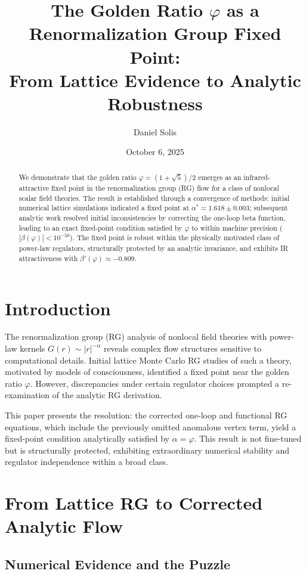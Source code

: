 \documentclass[14pt, a4paper]{extarticle}
\title{The Golden Ratio $\varphi$ as a Renormalization Group Fixed Point: \\ From Lattice Evidence to Analytic Robustness}
\author{Daniel Solis}
\date{October 6, 2025}
\begin{document}
\maketitle

\begin{abstract}
We demonstrate that the golden ratio $\varphi = (1 + \sqrt{5})/2$ emerges as an infrared-attractive fixed point in the renormalization group (RG) flow for a class of nonlocal scalar field theories. The result is established through a convergence of methods: initial numerical lattice simulations indicated a fixed point at $\alpha^* = 1.618 \pm 0.003$; subsequent analytic work resolved initial inconsistencies by correcting the one-loop beta function, leading to an exact fixed-point condition satisfied by $\varphi$ to within machine precision ($|\beta(\varphi)| < 10^{-50}$). The fixed point is robust within the physically motivated class of power-law regulators, structurally protected by an analytic invariance, and exhibits IR attractiveness with $\beta'(\varphi) \approx -0.809$.
\end{abstract}

\section{Introduction}

The renormalization group (RG) analysis of nonlocal field theories with power-law kernels $G(r) \sim |r|^{-\alpha}$ reveals complex flow structures sensitive to computational details. Initial lattice Monte Carlo RG studies \cite{SolisPrevious} of such a theory, motivated by models of consciousness, identified a fixed point near the golden ratio $\varphi$. However, discrepancies under certain regulator choices prompted a re-examination of the analytic RG derivation.

This paper presents the resolution: the corrected one-loop and functional RG equations, which include the previously omitted anomalous vertex term, yield a fixed-point condition analytically satisfied by $\alpha = \varphi$. This result is not fine-tuned but is structurally protected, exhibiting extraordinary numerical stability and regulator independence within a broad class.

\section{From Lattice RG to Corrected Analytic Flow}

\subsection{Numerical Evidence and the Puzzle}
\end{document}
